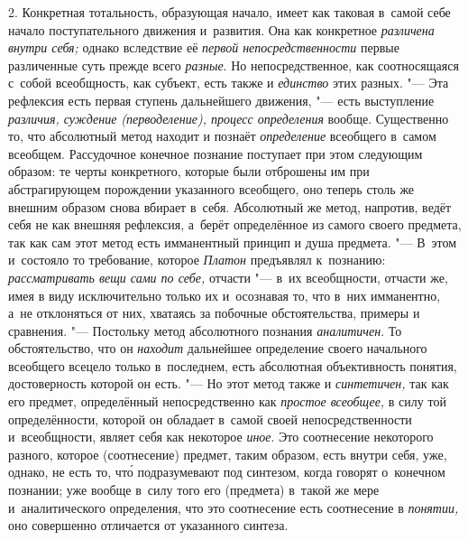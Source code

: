 2. Конкретная тотальность, образующая начало, имеет как
таковая в~самой себе начало поступательного движения и~развития. Она как
конкретное {\em различена внутри себя;}
однако вследствие её {\em первой непосредственности}
первые различенные суть прежде всего {\em разные}. Но
непосредственное, как соотносящаяся с~собой всеобщность, как субъект, есть
также и {\em единство} этих разных. "--- Эта рефлексия есть первая
ступень дальнейшего движения, "--- есть выступление
{\em различия, суждение (перводеление), процесс определения}
вообще. Существенно то, что абсолютный метод находит и
познаёт {\em определение}
всеобщего в~самом всеобщем. Рассудочное конечное познание
поступает при этом следующим образом: те черты конкретного, которые были
отброшены им при абстрагирующем порождении указанного всеобщего, оно теперь
столь же внешним образом снова вбирает в~себя. Абсолютный же метод,
напротив, ведёт себя не как внешняя рефлексия, а~берёт определённое из
самого своего предмета, так как сам этот метод есть имманентный принцип и
душа предмета. "--- В~этом и~состояло то
требование, которое {\em Платон}
предъявлял к~познанию:
{\em рассматривать вещи сами по себе,}
отчасти "--- в~их всеобщности, отчасти же, имея в
виду исключительно только их и~осознавая то, что в~них имманентно, а~не
отклоняться от них, хватаясь за побочные обстоятельства, примеры и
сравнения. "--- Постольку метод абсолютного познания
{\em аналитичен}. То
обстоятельство, что он {\em находит}
дальнейшее определение своего начального всеобщего всецело
только в~последнем, есть абсолютная объективность понятия, достоверность
которой он есть. "--- \label{bkm:bmpg224a}Но этот метод также и
{\em синтетичен,} так как
его предмет, определённый непосредственно как {\em простое всеобщее,} в
силу той определённости, которой он обладает в~самой своей
непосредственности и~всеобщности, являет себя как некоторое
{\em иное}. Это
соотнесение некоторого разного, которое (соотнесение) предмет, таким
образом, есть внутри себя, уже, однако, не есть то, чт\'{о} подразумевают под
синтезом, когда говорят о~конечном познании; уже вообще в~силу того его
(предмета) в~такой же мере и~аналитического определения, что это
соотнесение есть соотнесение в {\em понятии,} оно
совершенно отличается от указанного синтеза.

